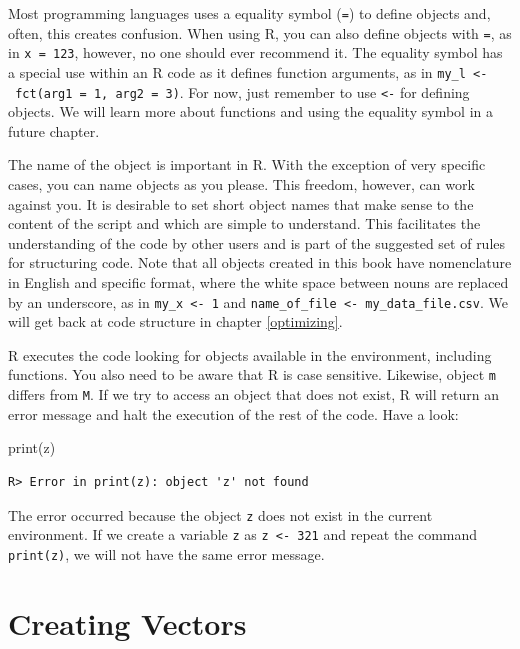 \documentclass[
  12pt,
]{book}
\newenvironment{Shaded}{\begin{snugshade}}{\end{snugshade}}
\newcommand{\FunctionTok}[1]{\textcolor[rgb]{0,0,0}{#1}}
\newcommand{\NormalTok}[1]{#1}
\begin{document}
Most programming languages uses a equality symbol (\texttt{=}) to define objects and, often, this creates confusion. When using R, you can also define objects with \texttt{=}, as in \texttt{x\ =\ 123}, however, no one should ever recommend it. The equality symbol has a special use within an R code as it defines function arguments, as in \texttt{my\_l\ \textless{}-\ fct(arg1\ =\ 1,\ arg2\ =\ 3)}. For now, just remember to use \texttt{\textless{}-} for defining objects. We will learn more about functions and using the equality symbol in a future chapter.

The name of the object is important in R. With the exception of very specific cases, you can name objects as you please. This freedom, however, can work against you. It is desirable to set short object names that make sense to the content of the script and which are simple to understand. This facilitates the understanding of the code by other users and is part of the suggested set of rules for structuring code. Note that all objects created in this book have nomenclature in English and specific format, where the white space between nouns are replaced by an underscore, as in \texttt{my\_x\ \textless{}-\ 1} and \texttt{name\_of\_file\ \textless{}-\ \textquotesingle{}my\_data\_file.csv\textquotesingle{}}. We will get back at code structure in chapter \ref{optimizing}.

R executes the code looking for objects available in the environment, including functions. You also need to be aware that R is case sensitive. Likewise, object \texttt{m} differs from \texttt{M}. If we try to access an object that does not exist, R will return an error message and halt the execution of the rest of the code. Have a look:

\begin{Shaded}
\begin{Highlighting}[]
\FunctionTok{print}\NormalTok{(z)}
\end{Highlighting}
\end{Shaded}

\begin{verbatim}
R> Error in print(z): object 'z' not found
\end{verbatim}

The error occurred because the object \texttt{z} does not exist in the current environment. If we create a variable \texttt{z} as \texttt{z\ \textless{}-\ 321} and repeat the command \texttt{print(z)}, we will not have the same error message.

\hypertarget{creating-vectors}{%
\section{Creating Vectors}\label{creating-vectors}}
\end{document}
